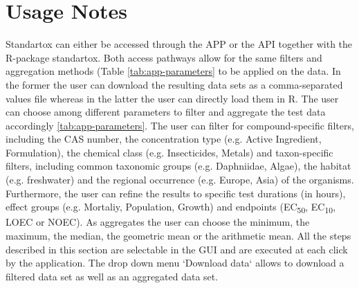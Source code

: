 \section*{Usage Notes}
Standartox can either be accessed through the APP or the API together with the R-package standartox. Both access pathways allow for the same filters and aggregation methods (Table \ref{tab:app-parameters} to be applied on the data. In the former the user can download the resulting data sets as a comma-separated values file whereas in the latter the user can directly load them in R. The user can choose among different parameters to filter and aggregate the test data accordingly \ref{tab:app-parameters}. The user can filter for compound-specific filters, including the CAS number, the concentration type (e.g. Active Ingredient, Formulation), the chemical class (e.g. Insecticides, Metals) and taxon-specific filters, including common taxonomic groups (e.g. Daphniidae, Algae), the habitat (e.g. freshwater) and the regional occurrence (e.g. Europe, Asia) of the organisms. Furthermore, the user can refine the results to specific test durations (in hours), effect groups (e.g. Mortaliy, Population, Growth) and endpoints (EC\textsubscript{50}, EC\textsubscript{10}, LOEC or NOEC).  As aggregates the user can choose the minimum, the maximum, the median, the geometric mean or the arithmetic mean. All the steps described in this section are selectable in the GUI and are executed at each click by the application. The drop down menu `Download data` allows to download a filtered data set as well as an aggregated data set.

